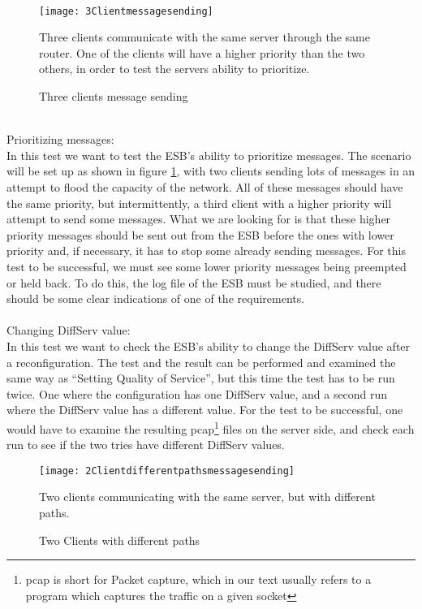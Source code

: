 \\
    \begin{figure}[h]
        \centering
        \texttt{[image: 3Clientmessagesending]}
        \caption{Three clients message sending}
	Three clients communicate with the same server through the same router. One of the clients will have a higher priority than the two others, in order to test the servers ability to prioritize.
        \label{fig:threeclientmessagesending}
    \end{figure}
\\   
Prioritizing messages:\\
    In this test we want to test the ESB’s ability to prioritize messages. The scenario will be set up as shown in figure \ref{fig:threeclientmessagesending}, with two clients sending lots of messages in an attempt to flood the capacity of the network. All of these messages should have the same priority, but intermittently, a third client with a higher priority will attempt to send some messages. What we are looking for is that these higher priority messages should be sent out from the ESB before the ones with lower priority and, if necessary, it has to stop some already sending messages. For this test to be successful, we must see some lower priority messages being preempted or held back. To do this, the log file of the ESB must be studied, and there should be some clear indications of one of the requirements.
\\\\
Changing DiffServ value:\\
    In this test we want to check the ESB’s ability to change the DiffServ value after a reconfiguration. The test and the result can be performed and examined the same way as “Setting Quality of Service”, but this time the test has to be run twice. One where the configuration has one DiffServ value, and a second run where the DiffServ value has a different value. For the test to be successful, one would have to examine the resulting \gls{pcap}\footnote{\Gls{pcap} is short for Packet capture, which in our text usually refers to a program which captures the traffic on a given socket} files on the server side, and check each run to see if the two tries have different DiffServ values.
\\
    \begin{figure}[h]
        \centering
        \texttt{[image: 2Clientdifferentpathsmessagesending]}
        \caption{Two Clients with different paths}
        Two  clients communicating with the same server, but with different paths.
        \label{fig:2 Clients different paths message sending}
    \end{figure}
